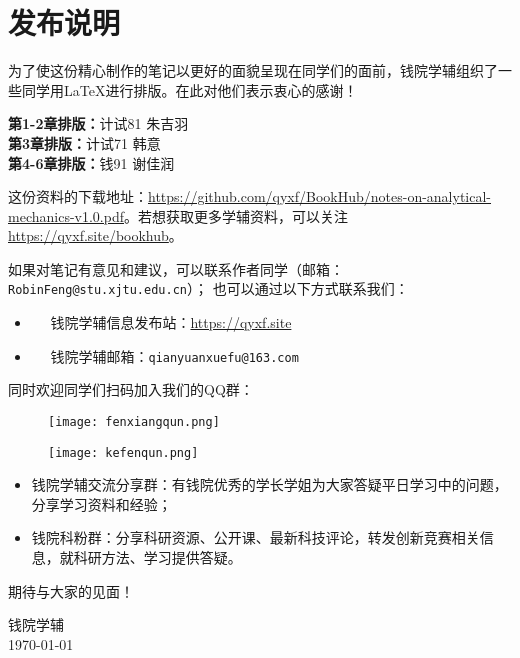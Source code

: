 \chapter*{发布说明}

为了使这份精心制作的笔记以更好的面貌呈现在同学们的面前，钱院学辅组织了一些同学用\LaTeX 进行排版。在此对他们表示衷心的感谢！
\vspace{0.5em}

\begin{tcolorbox}[title={\bfseries 参与排版成员}]
	 \textbf{第1-2章排版：}计试81 朱吉羽\\
	 \textbf{第3章排版：}计试71 韩意\\
	 \textbf{第4-6章排版：}钱91 谢佳润
\end{tcolorbox}

这份资料的下载地址：\url{https://github.com/qyxf/BookHub/notes-on-analytical-mechanics-v1.0.pdf}。若想获取更多学辅资料，可以关注\url{https://qyxf.site/bookhub}。

如果对笔记有意见和建议，可以联系作者\makeatletter\@author\makeatother 同学（\faEnvelopeOpen 邮箱： \texttt{RobinFeng@stu.xjtu.edu.cn}）；
也可以通过以下方式联系我们：

\begin{itemize}
	\item \faInternetExplorer ~~ 钱院学辅信息发布站：\url{https://qyxf.site}
	\item \faEnvelopeOpen ~~ 钱院学辅邮箱：\texttt{qianyuanxuefu@163.com}
\end{itemize}

同时欢迎同学们扫码加入我们的QQ群：

\begin{figure}[!ht]
	\centering
	\begin{minipage}[c]{0.45\textwidth}
		\centering
		\texttt{[image: fenxiangqun.png]}
	\end{minipage}%
	\quad
	\begin{minipage}[c]{0.45\textwidth}
		\centering
		\texttt{[image: kefenqun.png]}
	\end{minipage}
\end{figure}

\newpage\thispagestyle{empty}

\begin{itemize}
	\item 钱院学辅交流分享群：有钱院优秀的学长学姐为大家答疑平日学习中的问题，分享学习资料和经验；
	\item 钱院科粉群：分享科研资源、公开课、最新科技评论，转发创新竞赛相关信息，就科研方法、学习提供答疑。
\end{itemize}

期待与大家的见面！

\begin{flushright}
	钱院学辅\\
	\today
\end{flushright}

